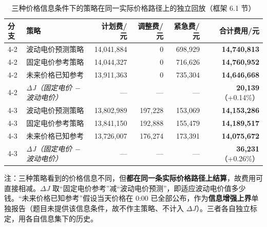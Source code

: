 \begin{table}[htbp]
  \centering
  \caption{三种价格信息条件下的策略在同一实际价格路径上的独立回放（框架 6.1 节）}
  \label{tab:p4-strategy}
  \footnotesize
  \begin{tabular}{llrrrr}
    \toprule
    分支 & 策略 & 计划费/元 & 调整费/元 & 紧急费/元 & 合计费用/元 \\
    \midrule
    4-2 & 波动电价预测策略 & 14,041,884 & 0 & 698,929 & \textbf{14,740,813} \\
    4-2 & 固定电价参考策略 & 14,044,327 & 0 & 716,626 & \textbf{14,760,952} \\
    4-2 & 未来价格已知参考 & 13,911,363 & 0 & 735,304 & \textbf{14,646,668} \\
    \midrule
    4-2 & \textit{ΔJ（固定电价 − 波动电价）} & --- & --- & --- & \textbf{20,139}（+0.14\%） \\
    4-3 & 波动电价预测策略 & 13,802,989 & 197,228 & 153,069 & \textbf{14,153,286} \\
    4-3 & 固定电价参考策略 & 13,841,150 & 192,888 & 155,479 & \textbf{14,189,517} \\
    4-3 & 未来价格已知参考 & 13,726,007 & 176,274 & 173,391 & \textbf{14,075,672} \\
    \midrule
    4-3 & \textit{ΔJ（固定电价 − 波动电价）} & --- & --- & --- & \textbf{36,231}（+0.26\%） \\
    \bottomrule
  \end{tabular}
  \par\vspace{2pt}
  \begin{minipage}{.92\textwidth}\footnotesize
    注：三种策略看到的价格信息不同，但\textbf{都在同一条实际价格路径上结算}，故费用可直接相减。$\Delta J$ 取``固定电价参考''减``波动电价预测''，即适应波动电价值多少钱。``未来价格已知参考''假设当天价格在 0:00 已全部公布，作为\textbf{信息增强上界}单独报告（题目未提供该信息条件，故不作主策略、不计入 $\Delta J$）。三者各自独立标定，用各自信息集下的历史。
  \end{minipage}
\end{table}


